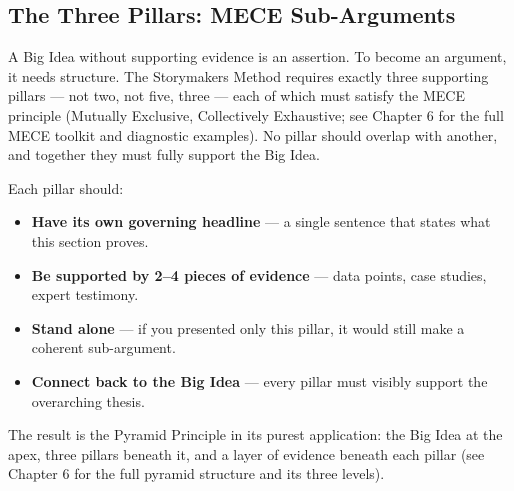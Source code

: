 
\subsection{The Three Pillars: MECE Sub-Arguments}

A Big Idea without supporting evidence is an assertion. To become an argument, it needs structure. The Storymakers Method requires exactly three supporting pillars --- not two, not five, three --- each of which must satisfy the MECE principle (Mutually Exclusive, Collectively Exhaustive; see Chapter 6 for the full MECE toolkit and diagnostic examples). No pillar should overlap with another, and together they must fully support the Big Idea.

Each pillar should:

\begin{itemize}
  \item \textbf{Have its own governing headline} --- a single sentence that states what this section proves.
  \item \textbf{Be supported by 2--4 pieces of evidence} --- data points, case studies, expert testimony.
  \item \textbf{Stand alone} --- if you presented only this pillar, it would still make a coherent sub-argument.
  \item \textbf{Connect back to the Big Idea} --- every pillar must visibly support the overarching thesis.
\end{itemize}

The result is the Pyramid Principle in its purest application: the Big Idea at the apex, three pillars beneath it, and a layer of evidence beneath each pillar (see Chapter 6 for the full pyramid structure and its three levels).


